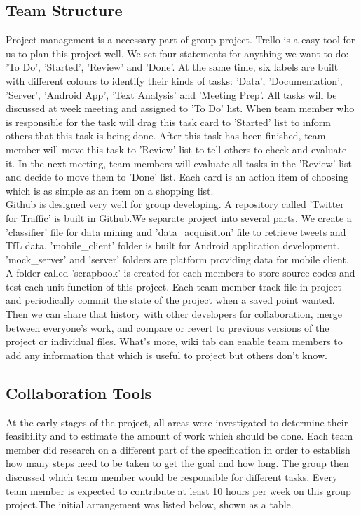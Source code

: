 \subsection{Team Structure}
Project management is a necessary part of group  project. Trello is a easy tool for us to plan this project well. We set four statements for anything we want to do: 'To Do', 'Started', 'Review' and 'Done'. At the same time, six labels are built with different colours to identify their kinds of tasks: 'Data', 'Documentation', 'Server', 'Android App', 'Text Analysis' and 'Meeting Prep'. All tasks will be discussed at week meeting and assigned to 'To Do' list. When team member who is responsible for the task will drag this task card to 'Started' list to inform others that this task is being done. After this task has been finished, team member will move this task to 'Review' list to tell others to check and evaluate it. In the next meeting, team members will evaluate all tasks in the 'Review' list and decide to move them to 'Done' list. Each card is an action item of choosing which is as simple as an item on a shopping list.\\
Github is designed very well for group developing. A repository called 'Twitter for Traffic' is built in Github.We separate project into several parts. We create a 'classifier' file for data mining and 'data\_acquisition' file to retrieve tweets and TfL data. 'mobile\_client' folder is built for Android application development. 'mock\_server' and 'server' folders are platform providing data for mobile client. A folder called 'scrapbook' is created for each members to store source codes and test each unit function of this project. Each team member track file in project and periodically commit the state of the project when a saved point wanted. Then we can share that history with other developers for collaboration, merge between everyone's work, and compare or revert to previous versions of the project or individual files. What's more, wiki tab can enable team members to add any information that which is useful to project but others don't know.
\subsection{Collaboration Tools}
At the early stages of the project, all areas were investigated to determine their feasibility and to estimate the amount of work which should be done. Each team member did research on a different part of the specification in order to establish how many steps need to be taken to get the goal and how long. The group then discussed which team member would be responsible for different tasks. Every team member is expected to contribute at least 10 hours per week on this group project.The initial arrangement was listed below, shown as a table.\\

